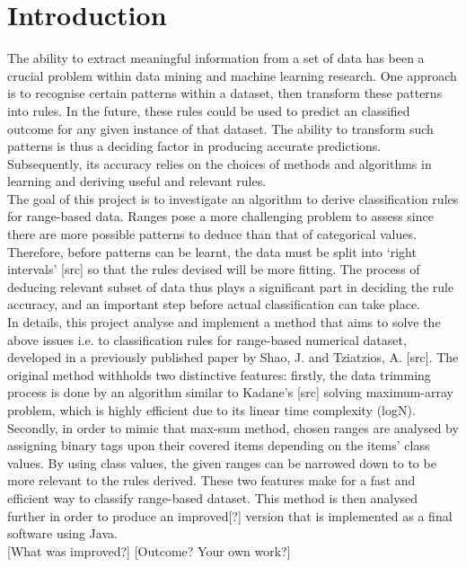 \chapter{Introduction}
The ability to extract meaningful information from a set of data has been a crucial problem within data mining and machine learning research. One approach is to recognise certain patterns within a dataset, then transform these patterns into rules. In the future, these rules could be used to predict an classified outcome for any given instance of that dataset. The ability to transform such patterns is thus a deciding factor in producing accurate predictions. Subsequently, its accuracy relies on the choices of methods and algorithms in learning and deriving useful and relevant rules. \\

The goal of this project is to investigate an algorithm to derive classification rules for range-based data. Ranges pose a more challenging problem to assess since there are more possible patterns to deduce than that of categorical values. Therefore, before patterns can be learnt, the data must be split into `right intervals' [src] so that the rules devised will be more fitting. The process of deducing relevant subset of data thus plays a significant part in deciding the rule accuracy, and an important step before actual classification can take place. \\

In details, this project analyse and implement a method that aims to solve the above issues i.e. to classification rules for range-based numerical dataset, developed in a previously published paper by Shao, J. and Tziatzios, A. [src]. The original method withholds two distinctive features: firstly, the data trimming process is done by an algorithm similar to Kadane's [src] solving maximum-array problem, which is highly efficient due to its linear time complexity (logN). Secondly, in order to mimic that max-sum method, chosen ranges are analysed by assigning binary tags upon their covered items depending on the items' class values. By using class values, the given ranges can be narrowed down to to be more relevant to the rules derived. These two features make for a fast and efficient way to classify range-based dataset. This method is then analysed further in order to produce an improved[?] version that is implemented as a final software using Java. \\

[What was improved?]
[Outcome? Your own work?]


